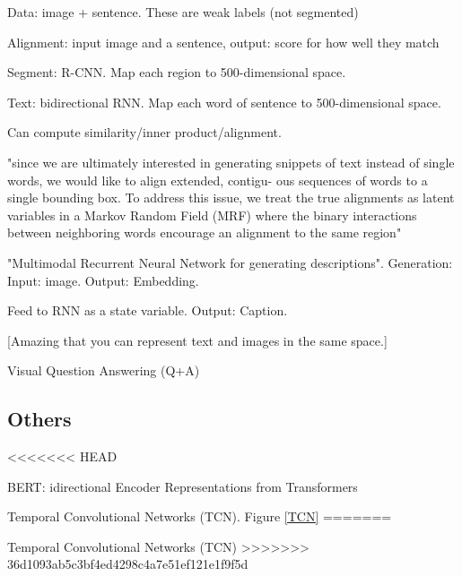 \documentclass[english]{article}
\begin{document}
\item Data:  image + sentence. These are weak labels (not segmented)

\item Alignment: input image and a sentence, output: score for how well they match

Segment: R-CNN. Map each region to 500-dimensional space.

Text: bidirectional RNN. Map each word of sentence to 500-dimensional space. 

Can compute similarity/inner product/alignment.

"since we are
ultimately interested in generating snippets of text instead
of single words, we would like to align extended, contigu-
ous sequences of words to a single bounding box.
To address this issue, we treat the true alignments as latent
variables in a Markov Random Field (MRF) where the binary interactions between neighboring words encourage an alignment to the same region"

\item "Multimodal Recurrent Neural Network for
generating descriptions". Generation: Input: image. Output: Embedding. 

Feed to RNN as a state variable. Output: Caption.

[Amazing that you can represent text and images in the same space.]
\eenum 

\item Visual Question Answering (Q+A)

\benum 
\item 
\eenum 

 
\eenum 


\subsection{Others}


\benum

<<<<<<< HEAD
\item BERT: idirectional Encoder Representations from Transformers

\item Temporal Convolutional Networks (TCN). Figure \ref{TCN}
=======
\item Temporal Convolutional Networks (TCN)
>>>>>>> 36d1093ab5c3bf4ed4298c4a7e51ef121e1f9f5d
\end{document}
